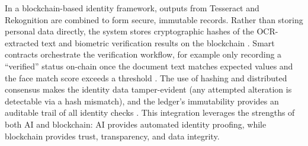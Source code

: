 \documentclass[a4paper,10pt]{report}
\begin{document}
In a blockchain-based identity framework, outputs from Tesseract and Rekognition are combined to form secure, immutable records. Rather than storing personal data directly, the system stores cryptographic hashes of the OCR-extracted text and biometric verification results on the blockchain \cite{atkar2025aiblockchain}. Smart contracts orchestrate the verification workflow, for example only recording a “verified” status on-chain once the document text matches expected values and the face match score exceeds a threshold \cite{atkar2025aiblockchain}. The use of hashing and distributed consensus makes the identity data tamper-evident (any attempted alteration is detectable via a hash mismatch), and the ledger’s immutability provides an auditable trail of all identity checks \cite{atkar2025aiblockchain}. This integration leverages the strengths of both AI and blockchain: AI provides automated identity proofing, while blockchain provides trust, transparency, and data integrity.


\end{document}
